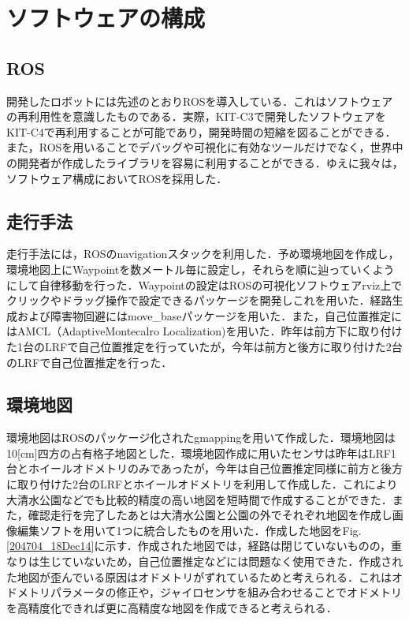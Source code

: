 \documentclass[10pt,a4paper]{jarticle}
\begin{document}
\section{ソフトウェアの構成}
\subsection{ROS}
開発したロボットには先述のとおりROSを導入している．これはソフトウェアの再利用性を意識したものである．実際，KIT-C3で開発したソフトウェアをKIT-C4で再利用することが可能であり，開発時間の短縮を図ることができる．また，ROSを用いることでデバッグや可視化に有効なツールだけでなく，世界中の開発者が作成したライブラリを容易に利用することができる．ゆえに我々は，ソフトウェア構成においてROSを採用した．
\subsection{走行手法}
走行手法には，ROSのnavigationスタックを利用した．予め環境地図を作成し，環境地図上にWaypointを数メートル毎に設定し，それらを順に辿っていくようにして自律移動を行った．Waypointの設定はROSの可視化ソフトウェアrviz上でクリックやドラッグ操作で設定できるパッケージを開発しこれを用いた．経路生成および障害物回避にはmove\_baseパッケージを用いた．また，自己位置推定にはAMCL（AdaptiveMontecalro Localization)を用いた．昨年は前方下に取り付けた1台のLRFで自己位置推定を行っていたが，今年は前方と後方に取り付けた2台のLRFで自己位置推定を行った．

\subsection{環境地図}
環境地図はROSのパッケージ化されたgmappingを用いて作成した．環境地図は10[cm]四方の占有格子地図とした．環境地図作成に用いたセンサは昨年はLRF1台とホイールオドメトリのみであったが，今年は自己位置推定同様に前方と後方に取り付けた2台のLRFとホイールオドメトリを利用して作成した．これにより大清水公園などでも比較的精度の高い地図を短時間で作成することができた．また，確認走行を完了したあとは大清水公園と公園の外でそれぞれ地図を作成し画像編集ソフトを用いて1つに統合したものを用いた．作成した地図をFig.\ref{204704_18Dec14}に示す．作成された地図では，経路は閉じていないものの，重なりは生じていないため，自己位置推定などには問題なく使用できた．作成された地図が歪んでいる原因はオドメトリがずれているためと考えられる．これはオドメトリパラメータの修正や，ジャイロセンサを組み合わせることでオドメトリを高精度化できれば更に高精度な地図を作成できると考えられる．
\end{document}
